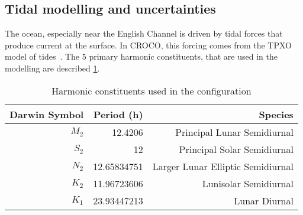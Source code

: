 \documentclass[../../Main_ManuscritThese.tex]{subfiles}
\newcommand{\CROCO}{CROCO}
\begin{document}
\subsection{Tidal modelling and uncertainties}
\label{ssec:tidal_modelling}
The ocean, especially near the English Channel is driven by tidal
forces that produce current at the surface. In \CROCO, this forcing comes
from the TPXO model of tides~\cite{egbert_efficient_2002}. The 5
primary harmonic constituents, that are used in the modelling are
described \cref{tab:tides_components}.
\begin{table}[!h]
  \centering
  \begin{tabular}{rrr}\toprule
    Darwin Symbol & Period (h)   & Species                           \\ \midrule
    $M_2$         & 12.4206      & Principal Lunar Semidiurnal       \\
    $S_2$         & 12           & Principal Solar Semidiurnal       \\
    $N_2$         & 12.65834751  & Larger Lunar Elliptic Semidiurnal \\
    $K_2$         & 11.96723606  & Lunisolar Semidiurnal             \\
    $K_1$         & 23.93447213  & Lunar Diurnal                     \\
    \bottomrule
  \end{tabular}
  \caption{Harmonic constituents used in the configuration}
  \label{tab:tides_components}
\end{table}
\end{document}

